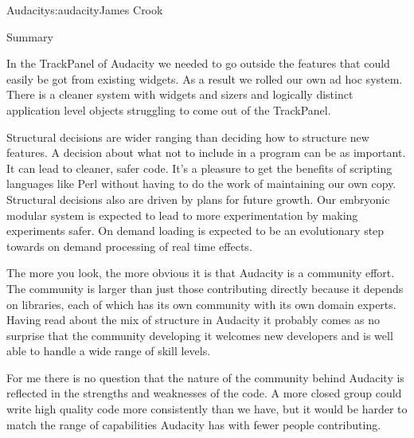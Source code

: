 \begin{aosachapter}{Audacity}{s:audacity}{James Crook}
\begin{aosasect1}{Summary}
\begin{aosaitemize}
\item In the TrackPanel of Audacity we needed to go outside the
  features that could easily be got from existing widgets.  As a
  result we rolled our own ad hoc system.  There is a cleaner system
  with widgets and sizers and logically distinct application level
  objects struggling to come out of the TrackPanel.

\item Structural decisions are wider ranging than deciding how to
  structure new features.  A decision about what not to include in a
  program can be as important.  It can lead to cleaner, safer code.
  It's a pleasure to get the benefits of scripting languages like Perl
  without having to do the work of maintaining our own copy.
  Structural decisions also are driven by plans for future growth.
  Our embryonic modular system is expected to lead to more
  experimentation by making experiments safer.  On demand loading is
  expected to be an evolutionary step towards on demand processing of
  real time effects.

\end{aosaitemize}

The more you look, the more obvious it is that Audacity is a community
effort.  The community is larger than just those contributing directly
because it depends on libraries, each of which has its own community
with its own domain experts.  Having read about the mix of structure
in Audacity it probably comes as no surprise that the community
developing it welcomes new developers and is well able to handle a
wide range of skill levels.

For me there is no question that the nature of the community behind
Audacity is reflected in the strengths and weaknesses of the code.  A
more closed group could write high quality code more consistently
than we have, but it would be harder to match the range
of capabilities Audacity has with fewer people contributing.

\end{aosasect1}

\end{aosachapter}
